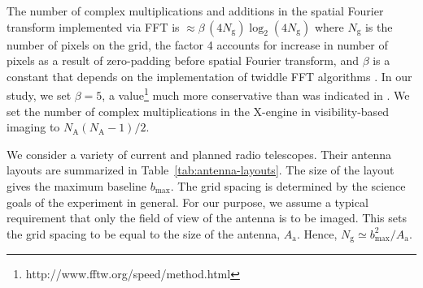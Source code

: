 \documentclass[a4paper,fleqn,usenatbib]{mnras}
\newcommand{\Nant}{N_\textrm{A}}
\newcommand{\Ngrid}{N_\textrm{g}}
\begin{document}
The number of complex multiplications and additions in the spatial Fourier 
transform implemented via FFT is $\approx \beta\,(4\Ngrid)\log_2(4\Ngrid)$ 
where $\Ngrid$ is the number of pixels on the grid, the factor 4 accounts for 
increase in number of pixels as a result of zero-padding before spatial Fourier 
transform, and $\beta$ is a constant that depends on the implementation of 
twiddle FFT algorithms \citep{bri74}. In our study, we set $\beta=5$, a 
value\footnote{http://www.fftw.org/speed/method.html} much more conservative 
than was indicated in \citet{mor11}. We set the number of complex 
multiplications in the X-engine in visibility-based imaging to 
$\Nant(\Nant-1)/2$.

We consider a variety of current and planned radio telescopes. Their antenna 
layouts are summarized in Table~\ref{tab:antenna-layouts}. The size of the 
layout gives the maximum baseline $b_\textrm{max}$. The grid spacing is 
determined by the science goals of the experiment in general. For our 
purpose, we assume a typical requirement that only the field of view of the 
antenna is to be imaged. This sets the grid spacing to be equal to the size 
of the antenna, $A_\textrm{a}$. Hence, 
$\Ngrid\simeq b_\textrm{max}^2/A_\textrm{a}$. 
\end{document}
